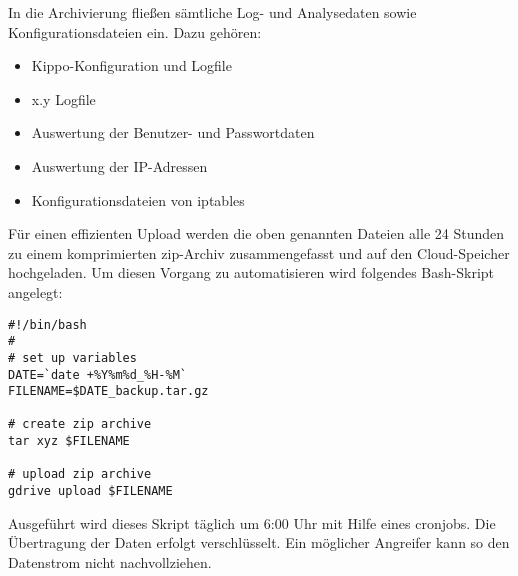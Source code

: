 In die Archivierung fließen sämtliche Log- und Analysedaten sowie Konfigurationsdateien ein. Dazu gehören:

\begin{itemize}
\item Kippo-Konfiguration und Logfile
\item x.y Logfile
\item Auswertung der Benutzer- und Passwortdaten
\item Auswertung der IP-Adressen
\item Konfigurationsdateien von iptables
\end{itemize}

Für einen effizienten Upload werden die oben genannten Dateien alle 24 Stunden zu einem komprimierten zip-Archiv zusammengefasst und auf den Cloud-Speicher hochgeladen. Um diesen Vorgang zu automatisieren wird folgendes Bash-Skript angelegt:

\begin{lstlisting}[style=customc]
#!/bin/bash
#
# set up variables
DATE=`date +%Y%m%d_%H-%M`
FILENAME=$DATE_backup.tar.gz

# create zip archive
tar xyz $FILENAME

# upload zip archive
gdrive upload $FILENAME
\end{lstlisting}

Ausgeführt wird dieses Skript täglich um 6:00 Uhr mit Hilfe eines cronjobs. Die Übertragung der Daten erfolgt verschlüsselt. Ein möglicher Angreifer kann so den Datenstrom nicht nachvollziehen. %